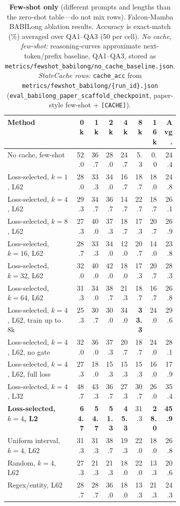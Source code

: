 \documentclass[10pt]{article}
\begin{document}
\begin{table}[t]
\centering
\small
\setlength{\tabcolsep}{4pt}
\caption{\textbf{Few-shot only} (different prompts and lengths than the zero-shot table---do not mix rows). Falcon-Mamba BABILong ablation results. Accuracy is exact-match (\%) averaged over QA1--QA3 (50 per cell). \emph{No cache, few-shot:} reasoning-curves approximate next-token/prefix baseline, QA1--QA3, stored as \texttt{metrics/fewshot\_babilong/no\_cache\_baseline.json}. \emph{StateCache rows:} \texttt{cache\_acc} from \texttt{metrics/fewshot\_babilong/\{run\_id\}.json} (\texttt{eval\_babilong\_paper\_scaffold\_checkpoint}, paper-style few-shot + \texttt{[CACHE]}).}
\label{tab:fewshot-babilong-ablation-results}
\begin{tabular}{>{\raggedright\arraybackslash}p{0.40\linewidth}rrrrrrr}
\toprule
\textbf{Method} & \textbf{0k} & \textbf{1k} & \textbf{2k} & \textbf{4k} & \textbf{8k} & \textbf{16k} & \textbf{Avg.} \\
\midrule
No cache, few-shot & 52.0 & 36.7 & 28.0 & 24.7 & 5.3 & 0.0 & 24.4 \\
\midrule
Loss-selected, $k=1$, L62 & 28.0 & 33.3 & 34.0 & 16.7 & 18.7 & 18.0 & 24.8 \\
Loss-selected, $k=4$, L62 & 29.3 & 34.7 & 36.7 & 14.7 & 22.7 & 18.7 & 26.1 \\
Loss-selected, $k=8$, L62 & 27.3 & 40.0 & 37.3 & 18.7 & 17.3 & 20.7 & 26.9 \\
Loss-selected, $k=16$, L62 & 28.7 & 33.3 & 34.0 & 12.0 & 20.7 & 14.0 & 23.8 \\
Loss-selected, $k=32$, L62 & 32.0 & 40.0 & 42.0 & 18.0 & 17.3 & 20.7 & 28.3 \\
Loss-selected, $k=64$, L62 & 31.3 & 34.0 & 38.7 & 21.3 & 18.7 & 16.7 & 26.8 \\
Loss-selected, $k=4$, L62, train up to 8k & 25.3 & 30.7 & 30.0 & 34.0 & \textbf{33.3} & 24.0 & 29.6 \\
Loss-selected, $k=4$, L62, no gate & 32.0 & 36.0 & 37.3 & 20.7 & 18.7 & 24.0 & 28.1 \\
Loss-selected, $k=4$, L62, full loss & 27.3 & 18.0 & 15.3 & 15.3 & 15.3 & 16.0 & 17.9 \\
Loss-selected, $k=4$, L32 & 48.7 & 43.3 & 36.7 & 27.3 & 30.7 & 26.0 & 35.4 \\
\textbf{Loss-selected, $k=4$, L2} & \textbf{64.7} & \textbf{54.7} & \textbf{51.3} & \textbf{45.3} & 31.3 & \textbf{28.0} & \textbf{45.9} \\
Uniform interval, $k=4$, L62 & 31.3 & 31.3 & 38.7 & 19.3 & 22.0 & 18.0 & 26.8 \\
Random, $k=4$, L62 & 27.3 & 21.3 & 21.3 & 18.0 & 22.0 & 13.3 & 20.6 \\
Regex/entity, L62 & 28.7 & 28.7 & 36.0 & 18.0 & 13.3 & 21.3 & 24.3 \\
\bottomrule
\end{tabular}
\end{table}
\end{document}
